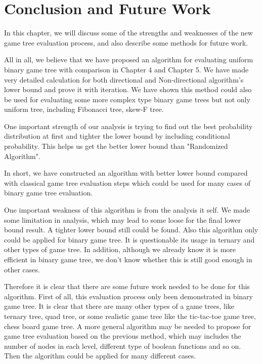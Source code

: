 \chapter{Conclusion and Future Work}

In this chapter, we will discuss some of the strengths and weaknesses of the new game tree evaluation process, and also describe some methods for future work.

All in all, we believe that we have proposed an algorithm for evaluating uniform binary game tree with comparison in Chapter 4 and Chapter 5. We have made very detailed calculation for both directional and Non-directional algorithm's lower bound and prove it with iteration. We have shown this method could also be used for evaluating some more complex type binary game trees but not only uniform tree, including Fibonacci tree, skew-F tree. 

One important strength of our analysis is trying to find out the best probability distribution at first and tighter the lower bound by including conditional probability. This helps us get the better lower bound than "Randomized Algorithm".

In short, we have constructed an algorithm with better lower bound compared with classical game tree evaluation steps which could be used for many cases of binary game tree evaluation.

One important weakness of this algorithm is from the analysis it self. We made some limitation in analysis, which may lead to some loose for the final lower bound result. A tighter lower bound still could be found. Also this algorithm only could be applied for binary game tree. It is questionable its usage in ternary and other types of game tree. In addition, although we already know it is more efficient in binary game tree, we don't know whether this is still good enough in other cases.

Therefore it is clear that there are some future work needed to be done for this algorithm. First of all, this evaluation process only been demonstrated in binary game tree. It is clear that there are many other types of a game trees, like ternary tree, quad tree, or some realistic game tree like the tic-tac-toe game tree, chess board game tree. A more general algorithm may be needed to propose for game tree evaluation based on the previous method, which may includes the number of nodes in each level, different type of boolean functions and so on. Then the algorithm could be applied for many different cases. 

